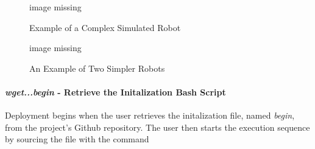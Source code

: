 \documentclass[9pt,twocolumn,twoside]{../../styles/osajnl}
\begin{document}
\begin{figure}[htbp]
\centering
image missing
\caption{Example of a Complex Simulated Robot}
\label{fig:complexRobot}
\end{figure}

\begin{figure}[htbp]
\centering
image missing
\caption{An Example of Two Simpler Robots}
\label{fig:simplerRobots}
\end{figure}

\paragraph{\textit{wget...begin} - Retrieve the Initalization Bash Script}
Deployment begins when the user retrieves the initalization file, named \textit{begin}, from the project's Github repository.  The user then starts the execution sequence by sourcing the file with the command 
\end{document}
